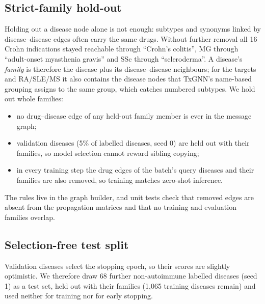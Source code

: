 \documentclass{ieeeaccess}
\begin{document}
\subsection{Strict-family hold-out}
Holding out a disease node alone is not enough: subtypes and synonyms linked by disease--disease edges often carry the same drugs. Without further removal all 16 Crohn indications stayed reachable through ``Crohn's colitis'', MG through ``adult-onset myasthenia gravis'' and SSc through ``scleroderma''. A disease's \emph{family} is therefore the disease plus its disease--disease neighbours; for the targets and RA/SLE/MS it also contains the disease nodes that TxGNN's name-based grouping assigns to the same group, which catches numbered subtypes. We hold out whole families:
\begin{itemize}
\item no drug--disease edge of any held-out family member is ever in the message graph;
\item validation diseases (5\% of labelled diseases, seed 0) are held out with their families, so model selection cannot reward sibling copying;
\item in every training step the drug edges of the batch's query diseases and their families are also removed, so training matches zero-shot inference.
\end{itemize}
The rules live in the graph builder, and unit tests check that removed edges are absent from the propagation matrices and that no training and evaluation families overlap.

\subsection{Selection-free test split}
\label{sec:testsplit}
Validation diseases select the stopping epoch, so their scores are slightly optimistic. We therefore draw 68 further non-autoimmune labelled diseases (seed 1) as a test set, held out with their families (1,065 training diseases remain) and used neither for training nor for early stopping.
\end{document}
